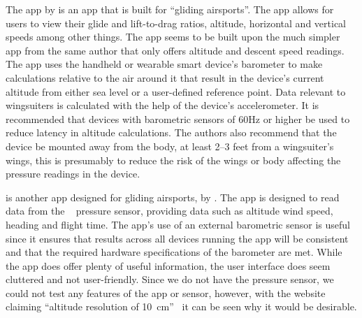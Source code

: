 \documentclass[11pt, twocolumn]{article}
\begin{document}
The  app by \textcite{pfm_technologies_llc_l/d_2015} is an app that is built for ``gliding airsports''. The app allows for users to view their glide and lift-to-drag ratios, altitude, horizontal and vertical speeds among other things. The app seems to be built upon the much simpler  app from the same author that only offers altitude and descent speed readings.
The  app uses the handheld or wearable smart device's barometer to make calculations relative to the air around it that result in the device's current altitude from either sea level or a user-defined reference point. Data relevant to wingsuiters is calculated with the help of the device's accelerometer. It is recommended that devices with barometric sensors of 60Hz or higher be used to reduce latency in altitude calculations. The authors also recommend that the device be mounted away from the body, at least 2--3 feet from a wingsuiter's wings, this is presumably to reduce the risk of the wings or body affecting the pressure readings in the device.

 is another app designed for gliding airsports, by \textcite{dickie_blueflyvario_2016}. The app is designed to read data from the ~\cite{noauthor_blueflyvario_nodate} pressure sensor, providing data such as altitude wind speed, heading and flight time.
The app's use of an external barometric sensor is useful since it ensures that results across all devices running the app will be consistent and that the required hardware specifications of the barometer are met.
While the app does offer plenty of useful information, the user interface does seem cluttered and not user-friendly. Since we do not have the  pressure sensor, we could not test any features of the app or sensor, however, with the website claiming ``altitude resolution of \SI{10}{\centi\metre}''~\cite{noauthor_blueflyvario_nodate} it can be seen why it would be desirable.
\end{document}

